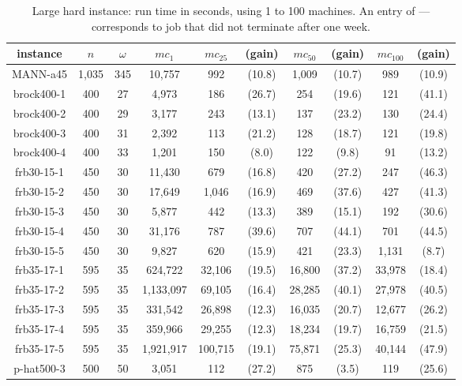 \documentclass{l4proj}
\begin{document}
\begin{table}
\begin{center}
\begin{scriptsize}
\begin{tabular}{|c|c|c|c|c c|c c|c c|} \hline 
instance & $n$ & $\omega$ & $mc_{1}$  & $mc_{25}$ & (gain)  & $mc_{50}$ & (gain)   & $mc_{100}$  & (gain)   \\ \hline
MANN-a45     & 1,035 & 345   & 10,757      & 992      & (10.8)   & 1,009     & (10.7)   & 989 & (10.9) \\
brock400-1   & 400 & 27    & 4,973       & 186      & (26.7)   & 254      & (19.6)   &  121 & (41.1) \\
brock400-2   & 400 & 29    & 3,177       & 243      & (13.1)   & 137      & (23.2)   &  130 & (24.4) \\
brock400-3   & 400 & 31    & 2,392       & 113      & (21.2)   & 128      & (18.7)   &  121 & (19.8) \\
brock400-4   & 400 & 33    & 1,201       & 150      & (8.0)    & 122      & (9.8)    &  91 & (13.2) \\
frb30-15-1   & 450 & 30    & 11,430      & 679      & (16.8)   & 420      & (27.2)   & 247         & (46.3)   \\
frb30-15-2   & 450 & 30    & 17,649      & 1,046    & (16.9)   & 469      & (37.6)   & 427        & (41.3)   \\
frb30-15-3   & 450 & 30    & 5,877       & 442      & (13.3)   & 389      & (15.1)   & 192        & (30.6)   \\
frb30-15-4   & 450 & 30    & 31,176      & 787      & (39.6)   & 707      & (44.1)   & 701        & (44.5)   \\
frb30-15-5   & 450 & 30    & 9,827       & 620      & (15.9)   & 421      & (23.3)   & 1,131       & (8.7)    \\
frb35-17-1   & 595 & 35  & 624,722     & 32,106    & (19.5)   & 16,800    & (37.2)   & 33,978    & (18.4)   \\
frb35-17-2   & 595 & 35  & 1,133,097    & 69,105    & (16.4)   & 28,285    & (40.1)   & 27,978    & (40.5)   \\
frb35-17-3   & 595 & 35  & 331,542     & 26,898    & (12.3)   & 16,035    & (20.7)   & 12,677    & (26.2)   \\
frb35-17-4   & 595 & 35  & 359,966     & 29,255    & (12.3)   & 18,234    & (19.7)   & 16,759    & (21.5)   \\
frb35-17-5   & 595 & 35  & 1,921,917    & 100,715   & (19.1)   & 75,871    & (25.3)   & 40,144    & (47.9)   \\
p-hat500-3   & 500 & 50  & 3,051       & 112      & (27.2)   & 875      & (3.5)    & 119      & (25.6)   \\ \hline

\end{tabular}
\end{scriptsize}
\end{center}
\caption{Large hard instance: run time in seconds, using 1 to 100 machines. An entry of --- corresponds to job that did not terminate after one week.}
\label{bigTable}
\end{table}
\end{document}
